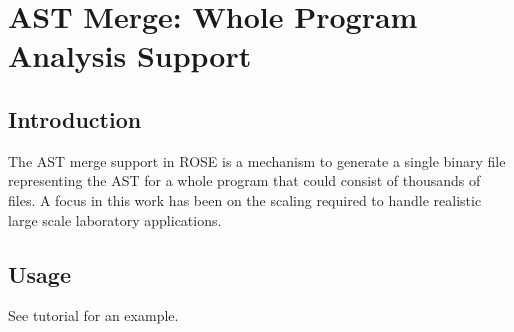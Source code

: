 
\chapter{AST Merge: Whole Program Analysis Support}

\label{astMerge::overview}

\section{Introduction}

   The AST merge support in ROSE is a mechanism to generate a
single binary file representing the AST for a whole program
that could consist of thousands of files.  A focus in this work 
has been on the scaling required to handle realistic large scale 
laboratory applications.



\section{Usage}
     See tutorial for an example.



